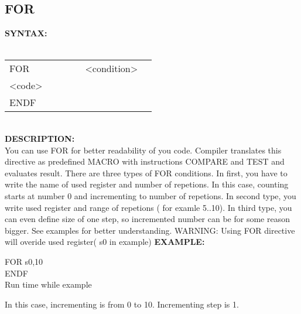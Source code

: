 {                \subsection{FOR}
                    \textbf{SYNTAX:}\\
                    \\ {
                        \texttt{}
                            \begin{tabular}[h!]{llll}
                                { \color{highlight_directive} FOR } & \verb'     ' &
                                { \color{highlight_constant} <condition> }\\
                                { \color{highlight_symbol} <code> }\\
                                { \color{highlight_directive} ENDF }
                            \end{tabular}
                        }\\
                    \textbf{DESCRIPTION:}\\
                    You can use FOR for better readability of you code. Compiler translates this directive as predefined MACRO with instructions COMPARE and TEST and
                    evaluates result. There are three types of FOR conditions. In first, you have to write the name of used register and number of repetions. In this case,
                    counting starts at number 0 and incrementing to number of repetions. In second type, you write used register and range of
                    repetions ( for examle 5..10). In third type, you can even define size of one step, so incremented number can be for some reason bigger.
                    See examples for better understanding. WARNING: Using FOR directive will overide used register( s0 in example)
                    \textbf{EXAMPLE:}\\
                            \begin{code}[h!]
                                    { \color{highlight_directive} FOR  }
                                    { \color{highlight_constant}   s0,10 }\\
                                    { \color{highlight_directive}  ENDF}\\
                                \caption{Run time while example}
                            \end{code}
                    In this case, incrementing is from 0 to 10. Incrementing step is 1.
                            \begin{code}[h!]

\end{code}}
